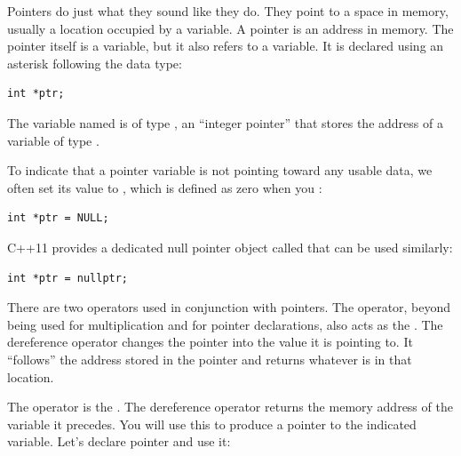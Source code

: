 
Pointers do just what they sound like they do. 
They point to a space in memory, usually a location occupied by a variable. 
A pointer is an address in memory. 
The pointer itself is a variable, but it also refers to a variable. 
It is declared using an asterisk following the data type:

\noindent\begin{minipage}{\linewidth}\begin{lstlisting}
int *ptr; 
\end{lstlisting}\end{minipage}

The variable named  is of type , an ``integer pointer'' that stores the address of a variable of type .

To indicate that a pointer variable is not pointing toward any usable data, we often set its value to , which is defined as zero when you :

\noindent\begin{minipage}{\linewidth}\begin{lstlisting}
int *ptr = NULL;
\end{lstlisting}\end{minipage}

C++11 provides a dedicated null pointer object called  that can be used similarly:

\noindent\begin{minipage}{\linewidth}\begin{lstlisting}
int *ptr = nullptr;
\end{lstlisting}\end{minipage}

There are two operators used in conjunction with pointers. 
The \Code{*} operator, beyond being used for multiplication and for pointer declarations, also acts as the . 
The dereference operator changes the pointer into the value it is pointing to.
It ``follows'' the address stored in the pointer and returns whatever is in that location.

The \Code{\&} operator is the . 
The dereference operator returns the memory address of the variable it precedes. 
You will use this to produce a pointer to the indicated variable. Let's declare pointer  and use it:

